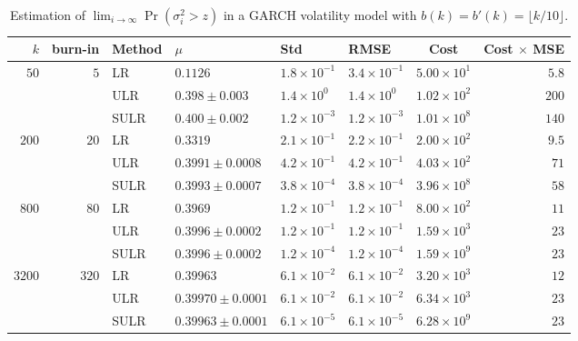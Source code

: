 \documentclass[a4paper,11pt]{article}
\begin{document}
\begin{table}
\caption{Estimation of \(\lim_{i\rightarrow\infty}\Pr(\sigma_{i}^{2}> z)\) in a GARCH volatility model with  \(b(k)=b'(k)=\lfloor k/10\rfloor\). }
\begin{small}
\begin{tabular}{rrllllcr}\hline
$k$ &  burn-in & Method  & $\mu$  & Std & RMSE & Cost& Cost $\times$ MSE \\ \hline
$50$&$5 $&LR & $0.1126$ & $1.8\times10^{-1}$ & $3.4\times10^{-1}$ & $5.00\times10^1$ & $5.8$\\
& &ULR & $0.398 \pm 0.003$ & $1.4\times10^0$ & $1.4\times10^0$ & $1.02\times10^2$ & $200$\\
& &SULR & $0.400 \pm 0.002$ & $1.2\times10^{-3}$ & $1.2\times10^{-3}$ & $1.01\times10^8$ & $140$\\
$200$&$20 $&LR & $0.3319$ & $2.1\times10^{-1}$ & $2.2\times10^{-1}$ & $2.00\times10^2$ & $9.5$\\
& &ULR & $0.3991 \pm 0.0008$ & $4.2\times10^{-1}$ & $4.2\times10^{-1}$ & $4.03\times10^2$ & $71$\\
& &SULR & $0.3993 \pm 0.0007$ & $3.8\times10^{-4}$ & $3.8\times10^{-4}$ & $3.96\times10^8$ & $58$\\
$800$&$80 $&LR & $0.3969$ & $1.2\times10^{-1}$ & $1.2\times10^{-1}$ & $8.00\times10^2$ & $11$\\
& &ULR & $0.3996 \pm 0.0002$ & $1.2\times10^{-1}$ & $1.2\times10^{-1}$ & $1.59\times10^3$ & $23$\\
& &SULR & $0.3996 \pm 0.0002$ & $1.2\times10^{-4}$ & $1.2\times10^{-4}$ & $1.59\times10^9$ & $23$\\
$3200$&$320 $&LR & $0.39963$ & $6.1\times10^{-2}$ & $6.1\times10^{-2}$ & $3.20\times10^3$ & $12$\\
& &ULR & $0.39970 \pm 0.0001$ & $6.1\times10^{-2}$ & $6.1\times10^{-2}$ & $6.34\times10^3$ & $23$\\
& &SULR & $0.39963 \pm 0.0001$ & $6.1\times10^{-5}$ & $6.1\times10^{-5}$ & $6.28\times10^9$ & $23$\\
\hline\end{tabular}
 \end{small}
\label{tab:GARCH0.1}
\end{table}
\end{document}
